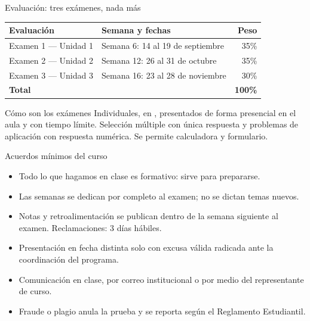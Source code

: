 \documentclass[aspectratio=169,10pt]{beamer}
\begin{document}
\begin{frame}{Evaluación: tres exámenes, nada más}
  \begin{center}
  \begin{tabular}{@{}llr@{}}
    \toprule
    \textbf{Evaluación} & \textbf{Semana y fechas} & \textbf{Peso} \\
    \midrule
    Examen 1 — Unidad 1 & Semana 6: 14 al 19 de septiembre & 35\% \\
    Examen 2 — Unidad 2 & Semana 12: 26 al 31 de octubre   & 35\% \\
    Examen 3 — Unidad 3 & Semana 16: 23 al 28 de noviembre & 30\% \\
    \midrule
    \textbf{Total} & & \textbf{100\%} \\
    \bottomrule
  \end{tabular}
  \end{center}

  \vspace{0.3cm}
  \begin{alertblock}{Cómo son los exámenes}
    \footnotesize
    Individuales, en , presentados de forma
    presencial en el aula y con tiempo límite. Selección múltiple con única
    respuesta y problemas de aplicación con respuesta numérica. Se permite
    calculadora y formulario.
  \end{alertblock}
\end{frame}

\begin{frame}{Acuerdos mínimos del curso}
  \begin{itemize}
    \item {} Todo lo que
          hagamos en clase es formativo: sirve para prepararse.
    \item Las semanas  se dedican por completo al examen;
          no se dictan temas nuevos.
    \item Notas y retroalimentación se publican dentro de la semana siguiente
          al examen. Reclamaciones: 3 días hábiles.
    \item Presentación en fecha distinta solo con excusa válida radicada ante
          la coordinación del programa.
    \item Comunicación en clase, por correo institucional o por medio del
          representante de curso.
    \item Fraude o plagio anula la prueba y se reporta según el Reglamento
          Estudiantil.
  \end{itemize}
\end{frame}
\end{document}
